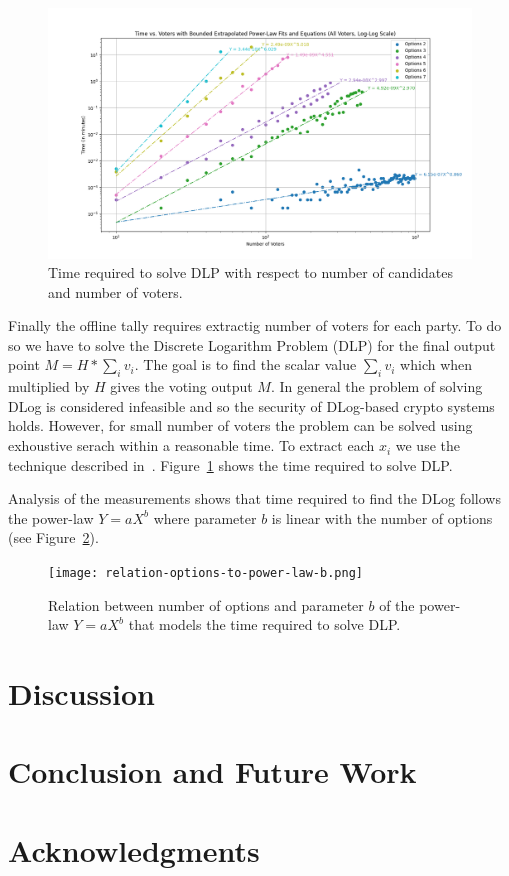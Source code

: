 \documentclass{article}
\begin{document}
\begin{figure}
    \centering
    \includegraphics[width=\textwidth]{dlog-search-time.png}
    \caption{Time required to solve DLP with respect to number of candidates and number of voters.}
    \label{fig:dlog-search}
\end{figure}
Finally the offline tally requires extractig number of voters for each party. To do so we have to solve the Discrete Logarithm Problem (DLP) for the final output point $M = H * \sum_i v_i$. The goal is to find the scalar value $\sum_i v_i$ which when multiplied by $H$ gives the voting output $M$. In general the problem of solving DLog is considered infeasible and so the security of DLog-based crypto systems holds. However, for small number of voters the problem can be solved using exhoustive serach within a reasonable time. To extract each $x_i$ we use the technique described in~\cite{haoAnonymousVotingTworound2010}. Figure~\ref{fig:dlog-search} shows the time required to solve DLP.

Analysis of the measurements shows that time required to find the DLog follows the power-law $Y=aX^b$ where parameter $b$ is linear with the number of options (see Figure~\ref{fig:relation-options-to-power-law-b}).

\begin{figure}
    \centering
    \texttt{[image: relation-options-to-power-law-b.png]}
    \caption{Relation between number of options and parameter $b$ of the power-law $Y=aX^b$ that models the time required to solve DLP.}
    \label{fig:relation-options-to-power-law-b}
\end{figure}

\section{Discussion}

\section{Conclusion and Future Work}

\section{Acknowledgments}




\end{document}
